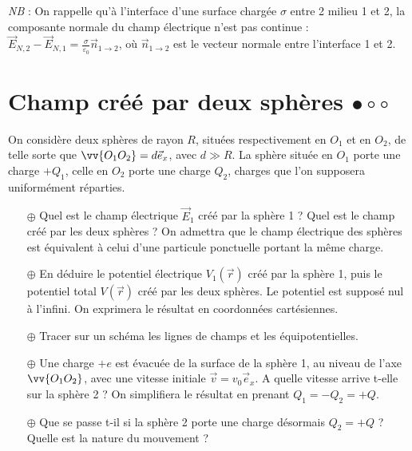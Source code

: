 \documentclass{report}
\begin{document}
\textit{NB} : On rappelle qu'à l'interface d'une surface chargée $\sigma$ entre 2 milieu 1 et 2, la composante normale du champ électrique n'est pas continue : $\vec{E}_{N,2}-\vec{E}_{N,1}=\frac{\sigma}{\varepsilon_0}\vec{n}_{1\rightarrow2}$, où $\vec{n}_{1\rightarrow2}$ est le vecteur normale entre l'interface 1 et 2.



\newpage

\section*{Champ créé par deux sphères $\bullet\circ\circ$}

On considère deux sphères de rayon $R$, situées respectivement en $O_1$ et en $O_2$, de telle sorte que $\vv{O_1O_2}=d\vec{e}_x$, avec $d\gg R$. La sphère située en $O_1$ porte une charge $+Q_1$, celle en $O_2$ porte une charge $Q_2$, charges que l'on supposera uniformément réparties. 

\begin{itemize}

	\item[$\oplus$] Quel est le champ électrique $\vec{E}_1$ créé par la sphère 1 ? Quel est le champ créé par les deux sphères ? On admettra que le champ électrique des sphères est équivalent à celui d'une particule ponctuelle portant la même charge.
	
	\item[$\oplus$] En déduire le potentiel électrique $V_1(\vec{r})$ créé par la sphère 1, puis le potentiel total $V(\vec{r})$ créé par les deux sphères. Le potentiel est supposé nul à l'infini. On exprimera le résultat en coordonnées cartésiennes.
	
	\item[$\oplus$] Tracer sur un schéma les lignes de champs et les équipotentielles. 
	
	\item[$\oplus$] Une charge $+e$ est évacuée de la surface de la sphère 1, au niveau de l'axe $\vv{O_1O_2}$, avec une vitesse initiale $\vec{v}=v_0\vec{e}_x$. A quelle vitesse arrive t-elle sur la sphère 2 ? On simplifiera le résultat en prenant $Q_1=-Q_2=+Q$.
	
	\item[$\oplus$] Que se passe t-il si la sphère 2 porte une charge désormais $Q_2=+Q$ ? Quelle est la nature du mouvement ?

\end{itemize}
\end{document}
